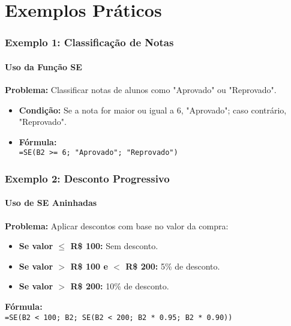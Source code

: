 \documentclass[12pt]{beamer}
\begin{document}
\section{Exemplos Práticos}

\begin{frame}
    \frametitle{Exemplo 1: Classificação de Notas}
    \framesubtitle{Uso da Função SE}
    \textbf{Problema:} Classificar notas de alunos como "Aprovado" ou "Reprovado".
    \begin{itemize}
        \item \textbf{Condição:} Se a nota for maior ou igual a 6, "Aprovado"; caso contrário, "Reprovado".
        \item \textbf{Fórmula: \\} \texttt{=SE(B2 >= 6; "Aprovado"; "Reprovado")}
    \end{itemize}
\end{frame}

\begin{frame}
    \frametitle{Exemplo 2: Desconto Progressivo}
    \framesubtitle{Uso de SE Aninhadas}
    \textbf{Problema:} Aplicar descontos com base no valor da compra:
    \begin{itemize}
        \item \textbf{Se valor $\leq $  R\$ 100:} Sem desconto.
        \item \textbf{Se valor $>$ R\$ 100 e $<$ R\$ 200:} 5\% de desconto.
        \item \textbf{Se valor $>$ R\$ 200:} 10\% de desconto.
    \end{itemize}
    \textbf{Fórmula:\\} 
    \texttt{=SE(B2 < 100; B2; SE(B2 < 200; B2 * 0.95; B2 * 0.90))}
\end{frame}
\end{document}
